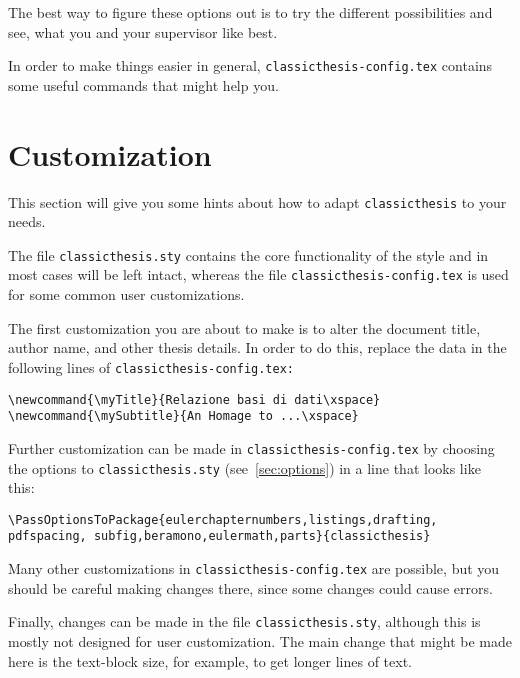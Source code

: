 \noindent The best way to figure these options out is to try the different possibilities and see, what you and your supervisor like best.

In order to make things easier in general, \texttt{classicthesis-config.tex} contains some useful commands that might help you.


\section{Customization}\label{sec:custom}

This section will give you some hints about how to adapt \texttt{classicthesis} to your needs.

The file \texttt{classicthesis.sty} contains the core functionality of the style and in most cases will be left intact, whereas the file \texttt{classic\-thesis-config.tex} is used for some common user customizations. 

The first customization you are about to make is to alter the document title, author name, and other thesis details. In order to do this, replace the data in the following lines of \texttt{classicthesis-config.tex:}

\begin{lstlisting}
\newcommand{\myTitle}{Relazione basi di dati\xspace}
\newcommand{\mySubtitle}{An Homage to ...\xspace}
\end{lstlisting}

Further customization can be made in \texttt{classicthesis-config.tex} by choosing the options to \texttt{classicthesis.sty} (see~\autoref{sec:options}) in a line that looks like this:

\begin{lstlisting}
\PassOptionsToPackage{eulerchapternumbers,listings,drafting, pdfspacing, subfig,beramono,eulermath,parts}{classicthesis}
\end{lstlisting}

Many other customizations in \texttt{classicthesis-config.tex} are possible, but you should be careful making changes there, since some changes could cause errors.

Finally, changes can be made in the file \texttt{classicthesis.sty},  although this is mostly not designed for user customization. The main change that might be made here is the text-block size, for example, to get longer lines of text.

